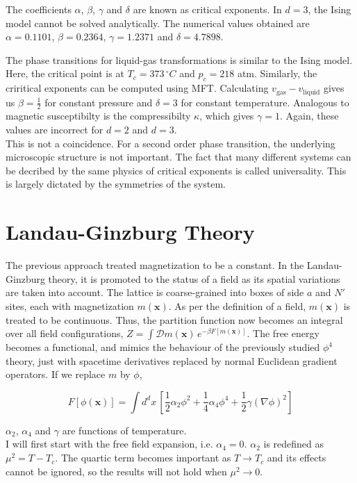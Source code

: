 \noindent The coefficients $\alpha$, $\beta$, $\gamma$ and $\delta$ are known as critical exponents. In $d=3$, the Ising model cannot be solved analytically. The numerical values obtained are $\alpha=0.1101$, $\beta=0.2364$, $\gamma=1.2371$ and $\delta=4.7898$.

\noindent The phase transitions for liquid-gas transformations is similar to the Ising model. Here, the critical point is at $T_c=373\,^\circ C$ and $p_c=218$ atm. Similarly, the criritical exponents can be computed using MFT. Calculating $v_\text{gas}-v_\text{liquid}$ gives us $\beta=\frac{1}{2}$ for constant pressure and $\delta=3$ for constant temperature. Analogous to magnetic susceptibilty is the compressibilty $\kappa$, which gives $\gamma=1$. Again, these values are incorrect for $d=2$ and $d=3$.\\

\noindent This is not a coincidence. For a second order phase transition, the underlying microscopic structure is not important. The fact that many different systems can be decribed by the same physics of critical exponents is called universality. This is largely dictated by the symmetries of the system. 

\section{Landau-Ginzburg Theory}
The previous approach treated magnetization to be a constant. In the Landau-Ginzburg theory, it is promoted to the status of a field as its spatial variations are taken into account. The lattice is coarse-grained into boxes of side $a$ and $N'$ sites, each with magnetization $m(\boldsymbol{x})$. As per the definition of a field, $m(\boldsymbol{x})$ is treated to be continuous. Thus, the partition function now becomes an integral over all field configurations, $Z=\int \mathcal{D}m(\boldsymbol{x})\,e^{-\beta F[m(\boldsymbol{x})]}$. The free energy becomes a functional, and mimics the behaviour of the previously studied $\phi^4$ theory, just with spacetime derivatives replaced by normal Euclidean gradient operators. If we replace $m$ by $\phi$,

$$F[\phi(\boldsymbol{x})]=\int d^dx\, \left[\frac{1}{2}\alpha_2 \phi^2+\frac{1}{4}\alpha_4 \phi^4+\frac{1}{2}\gamma(\nabla\phi)^2\right]$$

\noindent $\alpha_2$, $\alpha_4$ and $\gamma$ are functions of temperature.\\

\noindent I will first start with the free field expansion, i.e. $\alpha_4=0$. $\alpha_2$ is redefined as $\mu^2=T-T_c$. The quartic term becomes important as $T\rightarrow T_c$ and its effects cannot be ignored, so the results will not hold when $\mu^2\rightarrow 0$.\\

